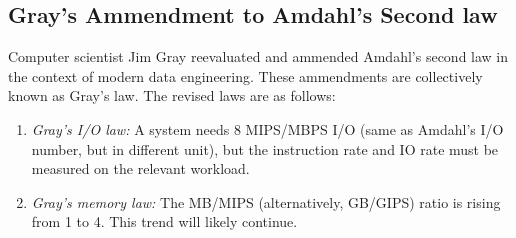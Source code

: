 \documentclass[journal]{IEEEtran}
\begin{document}
\subsection{Gray's Ammendment to Amdahl's Second law}
Computer scientist Jim Gray reevaluated and ammended Amdahl's second law in the context of modern data engineering. These ammendments are collectively known as Gray's law. The revised laws are as follows:
\begin{enumerate}
\item \textit{Gray's I/O law:} A system needs 8 MIPS/MBPS I/O (same as Amdahl's I/O number, but in different unit), but the instruction rate and IO rate must be measured on the relevant workload.
\item \textit{Gray's memory law:} The MB/MIPS (alternatively, GB/GIPS) ratio is rising from 1 to 4. This trend will likely continue.
\end{enumerate}
\end{document}
